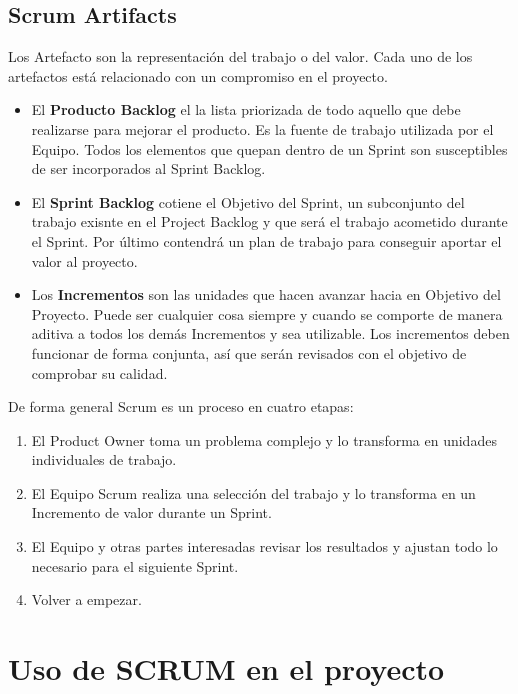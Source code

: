 \subsection{Scrum Artifacts}

Los Artefacto son la representación del trabajo o del valor. Cada uno de los artefactos está relacionado con un compromiso en el proyecto.

\begin{itemize}
    \item El \textbf{Producto Backlog} el la lista priorizada de todo aquello que debe realizarse para mejorar el producto. Es la fuente de trabajo utilizada por el Equipo. Todos los elementos que quepan dentro de un Sprint son susceptibles de ser incorporados al Sprint Backlog.
    \item El \textbf{Sprint Backlog} cotiene el Objetivo del Sprint, un subconjunto del trabajo exisnte en el Project Backlog y que será el trabajo acometido durante el Sprint. Por último contendrá un plan de trabajo para conseguir aportar el valor al proyecto.
    \item Los \textbf{Incrementos} son las unidades que hacen avanzar hacia en Objetivo del Proyecto. Puede ser cualquier cosa siempre y cuando se comporte de manera aditiva a todos los demás Incrementos y sea utilizable. Los incrementos deben funcionar de forma conjunta, así que serán revisados con el objetivo de comprobar su calidad.
\end{itemize}

De forma general Scrum es un proceso en cuatro etapas:

\begin{enumerate}
    \item El Product Owner toma un problema complejo y lo transforma en unidades individuales de trabajo.
    \item El Equipo Scrum realiza una selección del trabajo y lo transforma en un Incremento de valor durante un Sprint.
    \item El Equipo y otras partes interesadas revisar los resultados y ajustan todo lo necesario para el siguiente Sprint.
    \item Volver a empezar.
\end{enumerate}

\section{Uso de SCRUM en el proyecto}
\label{sec:uso-scrum-en-el-proyecto}

